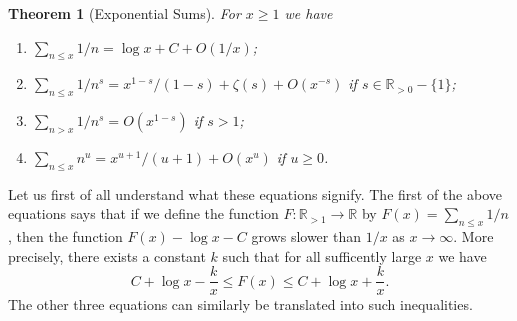 \documentclass{article}
\newtheorem{theorem}{Theorem}
\theoremstyle{definition}
\newcommand\RR{\mathbb R}
\begin{document}
\begin{theorem}[Exponential Sums]\label{theorem:expsums}
    For \(x\ge 1\) we have
    \begin{enumerate}
        \item \(\sum_{n\le x} 1/n = \log x + C + O(1/x)\);
        \item \(\sum_{n\le x} 1/n^s = x^{1-s}/(1-s) + \zeta(s) + O(x^{-s})\) if \(s\in\RR_{>0}-\{1\}\);
        \item \(\sum_{n>x} 1/n^s = O(x^{1-s})\) if \(s>1\);
        \item \(\sum_{n\le x} n^u = x^{u+1}/(u+1) + O(x^u)\) if \(u\ge 0\).
    \end{enumerate}
\end{theorem}

Let us first of all understand what these equations signify.
The first of the above equations says that if we define the function \(F:\RR_{>1}\to\RR\) by \(F(x) = \sum_{n\le x} 1/n\), then the function \(F(x) - \log x - C\) grows slower than \(1/x\) as \(x\to\infty\).
More precisely, there exists a constant \(k\) such that for all sufficently large \(x\) we have
\[C + \log x - \frac k x \le F(x) \le C + \log x + \frac k x.\]
The other three equations can similarly be translated into such inequalities.
\end{document}
